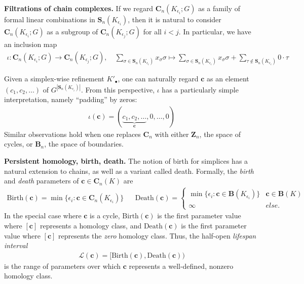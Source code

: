 \documentclass[11pt,onecolumn]{article}
\newcommand{\Chains}{\mathbf{C}}
\newcommand{\Boundaries}[0]{\mathbf{B}}
\newcommand{\Simplices}[0]{\mathbf{S}}
\newcommand{\Cycles}[0]{\mathbf{Z}}
\newcommand{\chain}{\mathbf{c}}
\newcommand{\birth}{\mathrm{Birth}}
\newcommand{\death}{\mathrm{Death}}
\newcommand{\persinterval}{\mathcal{L}}
\theoremstyle{plain}
\theoremstyle{definition}
\begin{document}
 

\noindent \textbf{Filtrations of chain complexes.} If we regard $\Chains_n(K_{\epsilon_i}; G)$ as a family of formal linear combinations in $\Simplices_n(K_{\epsilon_i})$, then it is natural to consider $\Chains_n(K_{\epsilon_i}; G)$ as a subgroup of $\Chains_n(K_{\epsilon_{j}}; G)$ for all $i<j$.  In particular, we have an inclusion map     \begin{align*}
    \textstyle
    \iota: \Chains_n(K_{\epsilon_i}; G) \to \Chains_n(K_{\epsilon_j}; G),
    \quad
    \sum_{\sigma \in \Simplices_n(K_{\epsilon_i})} x_\sigma \sigma
    \mapsto
    \sum_{\sigma \in \Simplices_n(K_{\epsilon_i})} x_\sigma \sigma
    +
    \sum_{\tau \notin \Simplices_n(K_{\epsilon_i})} 
    0 \cdot \tau
    \end{align*}

Given a simplex-wise refinement $K'_\bullet$, one can naturally regard $\chain$ as an element  $(c_1, c_2,  \ldots)$ of $ G^{|\Simplices_n(K_{\epsilon_i})|}$.  From this perspective, $\iota$ has a particularly simple interpretation, namely  ``padding'' by zeros:
    \begin{align*}
        \iota(\chain) = ( \underbrace{c_1, c_2, \ldots}_{\chain}, 0, \ldots, 0)
    \end{align*}
Similar observations hold when one replaces $\Chains_n$ with either $\Cycles_n$, the space of cycles, or $\Boundaries_n$, the space of boundaries.



\noindent \textbf{Persistent homology, birth, death.} The notion of birth for simplices has a natural extension to chains, as well as a variant called death.  Formally,  the \emph{birth} and \emph{death} parameters of  $\chain \in \Chains_n(K)$ are 
    \begin{align*}
    \birth(\chain) = \min \{\epsilon_i : \chain \in \Chains_n(K_{\epsilon_i}) \}
    &&
    \death(\chain) 
    = 
    \begin{cases}
    \min \{\epsilon_i : \chain \in \Boundaries(K_{\epsilon_i}) \} & \chain \in \Boundaries(K)
    \\
    \infty & else.
    \end{cases}
    \end{align*}
In the special case where $\chain$ is a cycle,  $\birth(\chain)$ is the first parameter value where $[\chain]$ represents a homology class, and $\death(\chain)$ is the first parameter value where $[\chain]$ represents the \emph{zero} homology class.   Thus, the half-open
\emph{lifespan interval} 
    \begin{align*}
        \persinterval(\chain) = [\birth(\chain), \death(\chain))
    \end{align*}
is the range of parameters over which $\chain$ represents a well-defined, nonzero homology class.
\end{document}
